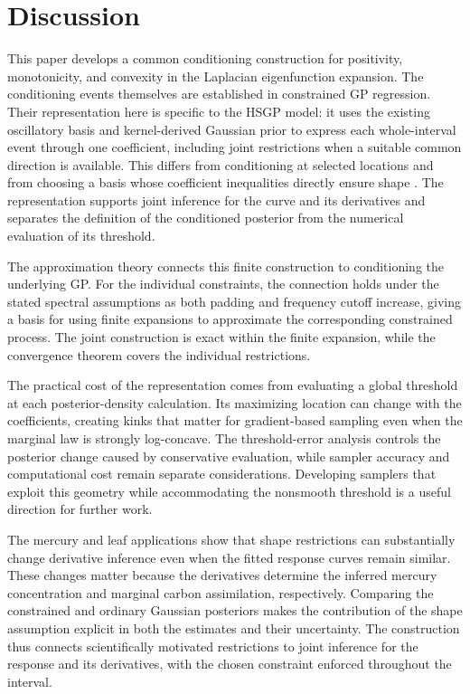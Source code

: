 \section{Discussion}\label{sec:discussion}

This paper develops a common conditioning construction for positivity,
monotonicity, and convexity in the Laplacian eigenfunction expansion.
The conditioning events themselves are established in constrained GP
regression. Their representation here is specific to the HSGP model:
it uses the existing oscillatory basis and kernel-derived Gaussian
prior to express each whole-interval event through one coefficient,
including joint restrictions when a suitable common direction is
available. This differs from conditioning at selected locations
\citep{daveiga2012inequality,daveiga2020linear} and from choosing a
basis whose coefficient inequalities directly ensure shape
\citep{maatouk2017constraints,lopera2018finite}. The representation
supports joint inference for the curve and its derivatives and
separates the definition of the conditioned posterior from the
numerical evaluation of its threshold.

The approximation theory connects this finite construction to
conditioning the underlying GP. For the individual constraints,
the connection holds under the stated spectral assumptions as both
padding and frequency cutoff increase, giving a basis for using
finite expansions to approximate the corresponding constrained
process. The joint construction is exact within the finite expansion,
while the convergence theorem covers the individual restrictions.

The practical cost of the representation comes from evaluating a
global threshold at each posterior-density calculation. Its
maximizing location can change with the coefficients, creating kinks
that matter for gradient-based sampling even when the marginal law
is strongly log-concave. The threshold-error analysis controls the
posterior change caused by conservative evaluation, while sampler
accuracy and computational cost remain separate considerations.
Developing samplers that exploit this geometry while accommodating
the nonsmooth threshold is a useful direction for further work.

The mercury and leaf applications show that shape restrictions can
substantially change derivative inference even when the fitted response
curves remain similar. These changes matter because the derivatives
determine the inferred mercury concentration and marginal carbon
assimilation, respectively. Comparing the constrained and ordinary
Gaussian posteriors makes the contribution of the shape assumption
explicit in both the estimates and their uncertainty. The construction
thus connects scientifically motivated restrictions to joint inference
for the response and its derivatives, with the chosen constraint
enforced throughout the interval.
